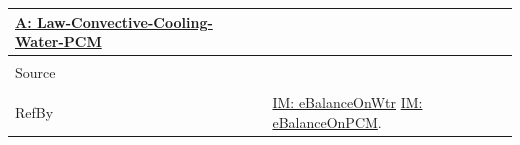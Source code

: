 \documentclass[12pt]{article}
\begin{document}
\begin{minipage}{\textwidth}
\begin{tabular}{p{} p{}}
                                                          \hyperref[A:Law-Convective-Cooling-Water-PCM]{A: Law-Convective-Cooling-Water-PCM}
                                                          \\ \midrule \\
                                                          Source & \cite{koothoor2013}
                                                                   \\ \midrule \\
                                                                   RefBy & \hyperref[IM:eBalanceOnWtr]{IM: eBalanceOnWtr} \hyperref[IM:eBalanceOnPCM]{IM: eBalanceOnPCM}.
\\ \bottomrule \end{tabular}
\end{minipage}\\
~\newline
\end{document}
